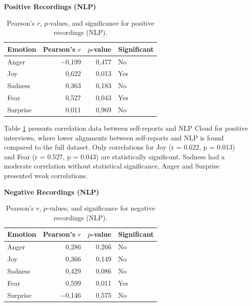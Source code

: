   \begin{table}[H]
    \centering
    \caption*{\textbf{Positive Recordings (NLP)}}
    \begin{tabular}{lrrl}
      \toprule
      \textbf{Emotion} & \textbf{Pearson’s \(r\)} & \textbf{\(p\)-value} & \textbf{Significant} \\
      \midrule
      Anger    & \(-\)0,199 & 0,477 & No  \\
      Joy      & 0,622     & 0,013 & Yes \\
      Sadness  & 0,363     & 0,183 & No  \\
      Fear     & 0,527     & 0,043 & Yes \\
      Surprise & 0,011     & 0,969 & No  \\
      \bottomrule
    \end{tabular}
    \caption{Pearson’s \(r\), \(p\)-values, and significance for positive recordings (NLP).}
    \label{tab:rq3_corr-nlp-pos}
  \end{table}
  
  Table \ref{tab:rq3_corr-nlp-pos} presents correlation data between self-reports and NLP Cloud for positive interviews, where lower alignments between self-reports and NLP is found compared to the full dataset. 
  Only correlations for Joy (r = 0.622, p = 0.013) and Fear (r = 0.527, p = 0.043) are statistically significant. Sadness had a moderate correlation without statistical significance, Anger and Surprise presented weak correlations. 
  \begin{table}[H]
    \centering
    \caption*{\textbf{Negative Recordings (NLP)}}
    \begin{tabular}{lrrl}
      \toprule
      \textbf{Emotion} & \textbf{Pearson’s \(r\)} & \textbf{\(p\)-value} & \textbf{Significant} \\
      \midrule
      Anger    & 0,286     & 0,266 & No  \\
      Joy      & 0,366     & 0,149 & No  \\
      Sadness  & 0,429     & 0,086 & No  \\
      Fear     & 0,599     & 0,011 & Yes \\
      Surprise & \(-\)0,146 & 0,575 & No  \\
      \bottomrule
    \end{tabular}
    \caption{Pearson’s \(r\), \(p\)-values, and significance for negative recordings (NLP).}
    \label{tab:rq3_corr-nlp-neg}
  \end{table}
  
